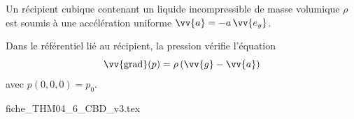 \finEntrainement





\hauteurLargeurCadreReponse		{7mm}{5cm}
\typeEntrainement				{} %
\initialisationEntrainement

                                \initialisationPartieGauche %
Un récipient cubique contenant un liquide incompressible de masse volumique $\rho$ est soumis à une accélération uniforme 
$\vv{a}=-a \, \vv{e_y}$. 

Dans le référentiel lié au récipient, la pression vérifie l'équation  
\[
\vv{\text{grad}}(p)=\rho \left(\vv{g}-\vv{a}\right)
\] 
avec $p(0,0,0)=p_0$.

                                \initialisationPartieDroite %
\def\ratioScaleImage{0.8}
\begin{center}
{fiche_THM04_6_CBD_v3.tex}
\end{center}
                               \finalisationDuPartageDePage %

